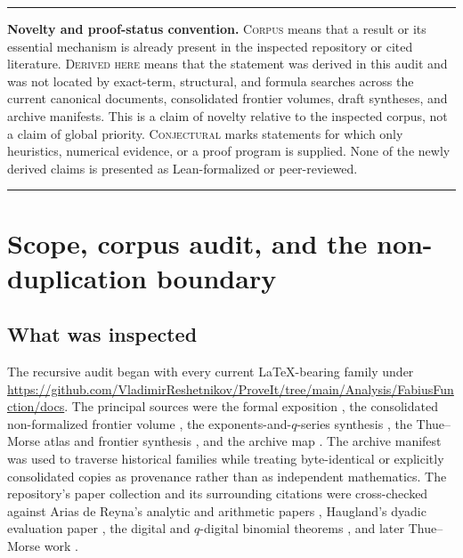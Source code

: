 \documentclass[11pt,oneside]{article}
\theoremstyle{definition}
\theoremstyle{remark}
\newenvironment{statusbox}{%
  \par\smallskip\noindent\begin{center}\begin{minipage}{0.94\textwidth}%
  \hrule\vspace{0.6em}\small
}{%
  \vspace{0.6em}\hrule\end{minipage}\end{center}\smallskip
}
\newcommand{\Corpus}{\textsc{Corpus}}
\newcommand{\Derived}{\textsc{Derived here}}
\newcommand{\Conjectural}{\textsc{Conjectural}}
\begin{document}
\begin{statusbox}
\textbf{Novelty and proof-status convention.}
\Corpus{} means that a result or its essential mechanism is already present in
the inspected repository or cited literature.  \Derived{} means that the
statement was derived in this audit and was not located by exact-term,
structural, and formula searches across the current canonical documents,
consolidated frontier volumes, draft syntheses, and archive manifests.  This is
a claim of novelty relative to the inspected corpus, not a claim of global
priority.  \Conjectural{} marks statements for which only heuristics, numerical
evidence, or a proof program is supplied.  None of the newly derived claims is
presented as Lean-formalized or peer-reviewed.
\end{statusbox}

\tableofcontents
\clearpage

\section{Scope, corpus audit, and the non-duplication boundary}

\subsection{What was inspected}
The recursive audit began with every current LaTeX-bearing family under
\url{https://github.com/VladimirReshetnikov/ProveIt/tree/main/Analysis/FabiusFunction/docs}.
The principal sources were the formal exposition
\cite{repo-primary}, the consolidated non-formalized frontier volume
\cite{repo-frontiers}, the exponents-and-\(q\)-series synthesis
\cite{repo-qseries}, the Thue--Morse atlas and frontier synthesis
\cite{repo-thuemorse}, and the archive map \cite{repo-archive}.  The archive
manifest was used to traverse historical families while treating byte-identical
or explicitly consolidated copies as provenance rather than as independent
mathematics.  The repository's paper collection and its surrounding citations
were cross-checked against Arias de Reyna's analytic and arithmetic papers
\cite{arias-up,arias-arithmetic}, Haugland's dyadic evaluation paper
\cite{haugland}, the digital and \(q\)-digital binomial theorems
\cite{nguyen-digital,mansour-nguyen}, and later Thue--Morse work
\cite{aistleitner-hofer-larcher,toth}.
\end{document}
